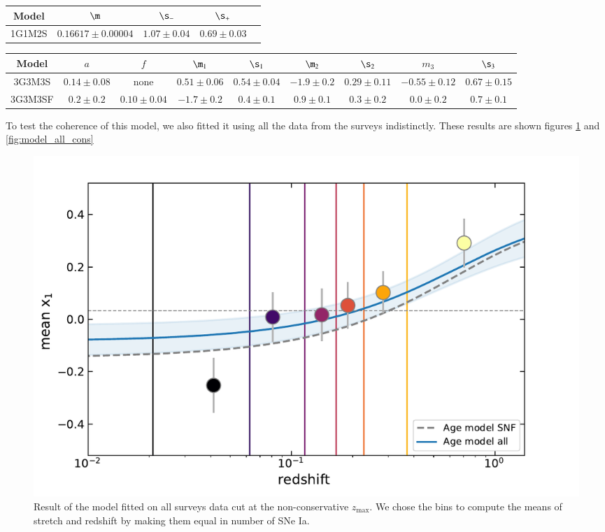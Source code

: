 \documentclass[]{aa} %
\begin{document}
\begin{table}[htbp!]
\begin{tabular}{c c c c c}\hline\hline

    Model & $\m$ & $\s_-$ & $\s_+$ \\\hline

    1G1M2S & $0.16617 \pm 0.00004$ & $1.07 \pm 0.04$ & $0.69 \pm 0.03$ \\\hline

\end{tabular} \bigbreak

\begin{tabular}{c c c c c c c c c}\hline\hline

    Model & $a$ & $f$ & $\m_1$ & $\s_1$ & $\m_2$ & $\s_2$ &
    $m_3$ & $\s_3$ \\\hline

    3G3M3S & $0.14 \pm 0.08$ & none & $0.51 \pm 0.06$ & $0.54 \pm 0.04$ & $-1.9
    \pm 0.2$ & $0.29 \pm 0.11$ & $-0.55 \pm 0.12$ & $0.67 \pm 0.15$ \\
    
    3G3M3SF & $0.2 \pm 0.2 $ & $0.10 \pm 0.04 $ & $-1.7 \pm 0.2$ & $0.4 \pm 0.1$
            & $0.9 \pm 0.1$ & $0.3 \pm 0.2$ & $0.0 \pm 0.2$ & $0.7 \pm 0.1$
            \\\hline

\end{tabular} \bigbreak

\end{table}

To test the coherence of this model, we also fitted it using all the data from the surveys indistinctly. These results are shown figures \ref{fig:model_all} and \ref{fig:model_all_cons}


\begin{figure}
    \centering
    \includegraphics[width=\linewidth]{Article_figures/stretchevol_all_vs_snf_maglim_sup.pdf}
    \caption{Result of the model fitted on all surveys data cut at the non-conservative $z_{\mathrm{max}}$. We chose the bins to compute the means of stretch and redshift by making them equal in number of SNe Ia.}
    \label{fig:model_all}
\end{figure}
\end{document}
